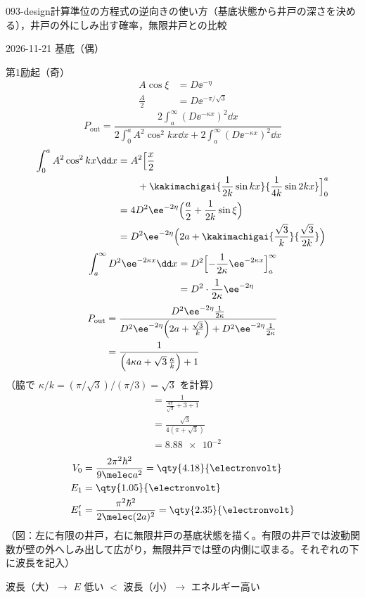 \documentclass[uplatex,dvipdfmx,a4paper,11pt]{jsarticle}
\begin{document}
\begin{mondai}{093-design}{計算}{準位の方程式の逆向きの使い方（基底状態から井戸の深さを決める），井戸の外にしみ出す確率，無限井戸との比較}
\begin{kotaeutsushi}{2026-11-21}
基底（偶）

第1励起（奇）
\begin{align*}
A\cos\xi&=D\ee^{-\eta}\\
\frac{A}{2}&=D\ee^{-\pi/\sqrt{3}}
\end{align*}
\[ P_{\mathrm{out}}=\frac{2\int_{a}^{\infty}(D\ee^{-\kappa x})^{2}\dd x}{2\int_{0}^{a}A^{2}\cos^{2}kx\dd x+2\int_{a}^{\infty}(D\ee^{-\kappa x})^{2}\dd x} \]
\begin{align*}
\int_{0}^{a}A^{2}\cos^{2}kx\dd x&=A^{2}\Bigl[\frac{x}{2}\\
&\qquad+\kakimachigai{\frac{1}{2k}\sin kx}{\frac{1}{4k}\sin 2kx}\Bigr]_{0}^{a}\\
&=4D^{2}\ee^{-2\eta}\Bigl(\frac{a}{2}+\frac{1}{2k}\sin\xi\Bigr)\\
&=D^{2}\ee^{-2\eta}\Bigl(2a+\kakimachigai{\frac{\sqrt{3}}{k}}{\frac{\sqrt{3}}{2k}}\Bigr)
\end{align*}
\begin{align*}
\int_{a}^{\infty}D^{2}\ee^{-2\kappa x}\dd x&=D^{2}\Bigl[-\frac{1}{2\kappa}\ee^{-2\kappa x}\Bigr]_{a}^{\infty}\\
&=D^{2}\cdot\frac{1}{2\kappa}\ee^{-2\eta}
\end{align*}
\begin{align*}
P_{\mathrm{out}}&=\frac{D^{2}\ee^{-2\eta}\frac{1}{2\kappa}}{D^{2}\ee^{-2\eta}\Bigl(2a+\frac{\sqrt{3}}{k}\Bigr)+D^{2}\ee^{-2\eta}\frac{1}{2\kappa}}\\
&=\frac{1}{\Bigl(4\kappa a+\sqrt{3}\,\frac{\kappa}{k}\Bigr)+1}
\end{align*}
（脇で $\kappa/k=(\pi/\sqrt{3})/(\pi/3)=\sqrt{3}$ を計算）
\begin{align*}
&=\frac{1}{\frac{4\pi}{\sqrt{3}}+3+1}\\
&=\frac{\sqrt{3}}{4(\pi+\sqrt{3})}\\
&=\num{8.88e-2}
\end{align*}
\begin{align*}
V_{0}&=\frac{2\pi^{2}\hbar^{2}}{9\melec a^{2}}=\qty{4.18}{\electronvolt}\\
E_{1}&=\qty{1.05}{\electronvolt}\\
E_{1}'&=\frac{\pi^{2}\hbar^{2}}{2\melec(2a)^{2}}=\qty{2.35}{\electronvolt}
\end{align*}
（図：左に有限の井戸，右に無限井戸の基底状態を描く。有限の井戸では波動関数が壁の外へしみ出して広がり，無限井戸では壁の内側に収まる。それぞれの下に波長を記入）

波長（大）$\to$ $E$ 低い $<$ 波長（小）$\to$ エネルギー高い
\end{kotaeutsushi}
\end{mondai}

\noteowari
\end{document}
